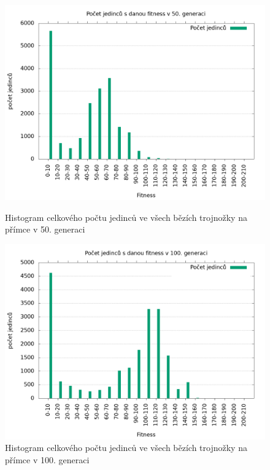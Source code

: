 \begin{figure}[h]
    \begin{minipage}[c]{0.48\linewidth}
        \includegraphics[width=\linewidth]{obrazky/trojnozka_primka_fitnessHistogram50.png}
        \caption{Histogram celkového počtu jedinců ve všech bězích trojnožky na přímce v 50. generaci}
        \label{fig:trojnozka_primka_histogram_50}
    \end{minipage}
    \hfill
    \begin{minipage}[c]{0.48\linewidth}
        \includegraphics[width=\linewidth]{obrazky/trojnozka_primka_fitnessHistogram100.png}
        \caption{Histogram celkového počtu jedinců ve všech bězích trojnožky na přímce v 100. generaci}
        \label{fig:trojnozka_primka_histogram_100}
    \end{minipage}
\end{figure}


